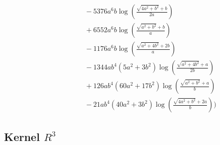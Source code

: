 \begin{align*}
&\phantom{{}=\frac{1}{15120 a^{4} b^{2}}\Bigg(}- 5376 a^{6} b \log\left(\frac{\sqrt{4 a^{2} + b^{2}} + b}{2 a}\right)\\
&\phantom{{}=\frac{1}{15120 a^{4} b^{2}}\Bigg(}+ 6552 a^{6} b \log\left(\frac{\sqrt{a^{2} + b^{2}} + b}{a}\right)\\
&\phantom{{}=\frac{1}{15120 a^{4} b^{2}}\Bigg(}- 1176 a^{6} b \log\left(\frac{\sqrt{a^{2} + 4 b^{2}} + 2 b}{a}\right)\\
&\phantom{{}=\frac{1}{15120 a^{4} b^{2}}\Bigg(}- 1344 a b^{4} \left(5 a^{2} + 3 b^{2}\right) \log\left(\frac{\sqrt{a^{2} + 4 b^{2}} + a}{2 b}\right)\\
&\phantom{{}=\frac{1}{15120 a^{4} b^{2}}\Bigg(}+ 126 a b^{4} \left(60 a^{2} + 17 b^{2}\right) \log\left(\frac{\sqrt{a^{2} + b^{2}} + a}{b}\right)\\
&\phantom{{}=\frac{1}{15120 a^{4} b^{2}}\Bigg(}- 21 a b^{4} \left(40 a^{2} + 3 b^{2}\right) \log\left(\frac{\sqrt{4 a^{2} + b^{2}} + 2 a}{b}\right)\Bigg)
\end{align*}
\subsection*{Kernel $R^{3}$}
